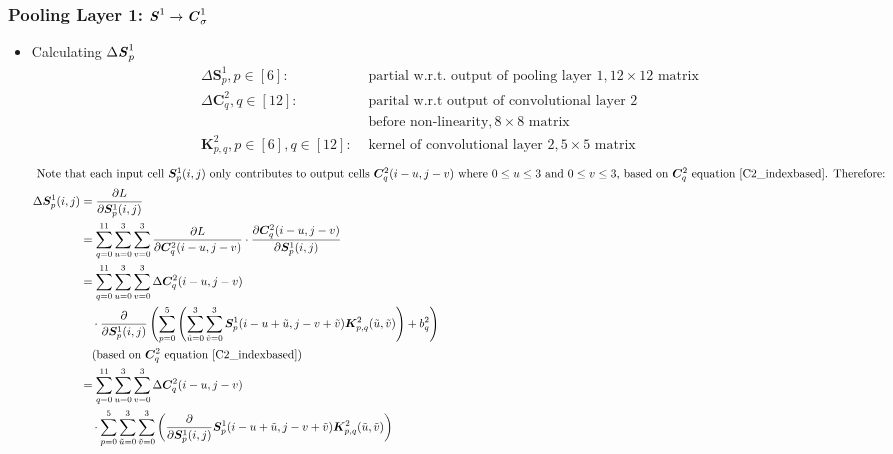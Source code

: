 \documentclass[12pt]{article}
\begin{document}
\subsubsection{Pooling Layer 1: $\textbf{\textit{S}}^1 \rightarrow \textbf{\textit{C}}^1_\sigma$}
\begin{itemize}
\item Calculating $\Delta \textbf{\textit{S}}_p^1$
\begin{align*}
    \Delta\bm{S}^1_p, p \in [6]:& \text{ partial w.r.t. output of pooling layer 1}, 12 \times 12 \text{ matrix}\\
    \Delta \bm{C}_{q}^2, q \in [12]:& \text{ parital w.r.t output of convolutional layer 2} \\& \text{ before non-linearity}, 8 \times 8 \text{ matrix}\\
    \bm{K}^2_{p, q}, p \in [6], q \in [12]:& \text{ kernel of convolutional layer 2}, 5 \times 5 \text{ matrix}
\end{align*}
\begin{align*}
    \intertext{
    Note that each input cell $\bm{S}_p^1(i, j)$ only contributes to output cells $\bm{C}_q^2(i - u, j - v)$ where $0 \leq u \leq 3$ and $0 \leq v \leq 3$, based on $\bm{C}^2_{q}$ equation $\eqref{C2_indexbased}$. Therefore:
    }
    \Delta \bm{S}_p^1(i, j)
    &= \frac{\partial L}{\partial \bm{S}_p^1(i, j)}
    \\
    &= \sum_{q=0}^{11}\sum_{u=0}^{3}\sum_{v=0}^{3}
    \frac{\partial L}{\partial \bm{C}_q^2(i - u, j - v)}
    \cdot
    \frac{\partial \bm{C}_q^2(i - u, j - v)}{\partial \bm{S}_p^1(i, j)}
    \\
    &= \sum_{q=0}^{11}\sum_{u=0}^{3}\sum_{v=0}^{3}
    \Delta \bm{C}_q^2(i - u, j - v)\\
    &\quad\cdot
    \frac{\partial}{\partial \bm{S}_p^1(i, j)}
    \left(\sum_{p = 0}^5\left(\sum_{\Tilde{u} = 0}^3\sum_{\Tilde{v} = 0}^3\bm{S}^1_p(i - u +  \Tilde{u}, j - v + \Tilde{v})\bm{K}^2_{p, q}(\Tilde{u}, \Tilde{v})\right) + b^2_q\right)
    \\
    &\quad (\text{based on $\bm{C}^2_{q}$ equation } \eqref{C2_indexbased})
    \\
    &= \sum_{q=0}^{11}\sum_{u=0}^{3}\sum_{v=0}^{3}
    \Delta \bm{C}_q^2(i - u, j - v)\\
    &\quad\cdot
    \sum_{p = 0}^5\sum_{\Tilde{u} = 0}^3\sum_{\Tilde{v} = 0}^3\left(\frac{\partial}{\partial \bm{S}_p^1(i, j)}\bm{S}^1_p(i - u +  \Tilde{u}, j - v + \Tilde{v})\bm{K}^2_{p, q}(\Tilde{u}, \Tilde{v})\right)
    \\

\end{align*}
\end{itemize}
\end{document}
